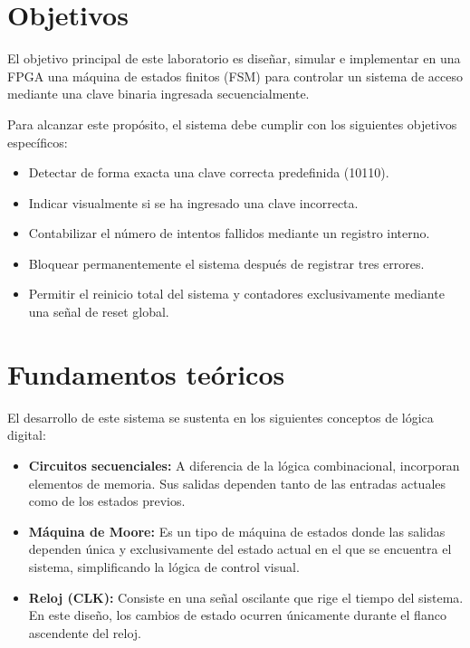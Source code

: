 \documentclass[letterpaper,12pt]{article}
\begin{document}
\section{Objetivos}
El objetivo principal de este laboratorio es diseñar, simular e implementar en una FPGA una máquina de estados finitos (FSM) para controlar un sistema de acceso mediante una clave binaria ingresada secuencialmente.

Para alcanzar este propósito, el sistema debe cumplir con los siguientes objetivos específicos:
\begin{itemize}
    \item Detectar de forma exacta una clave correcta predefinida (10110).
    \item Indicar visualmente si se ha ingresado una clave incorrecta.
    \item Contabilizar el número de intentos fallidos mediante un registro interno.
    \item Bloquear permanentemente el sistema después de registrar tres errores.
    \item Permitir el reinicio total del sistema y contadores exclusivamente mediante una señal de reset global.
\end{itemize}

\section{Fundamentos teóricos}
El desarrollo de este sistema se sustenta en los siguientes conceptos de lógica digital:
\begin{itemize}
    \item \textbf{Circuitos secuenciales:} A diferencia de la lógica combinacional, incorporan elementos de memoria. Sus salidas dependen tanto de las entradas actuales como de los estados previos.
    \item \textbf{Máquina de Moore:} Es un tipo de máquina de estados donde las salidas dependen única y exclusivamente del estado actual en el que se encuentra el sistema, simplificando la lógica de control visual.
    \item \textbf{Reloj (CLK):} Consiste en una señal oscilante que rige el tiempo del sistema. En este diseño, los cambios de estado ocurren únicamente durante el flanco ascendente del reloj.
\end{itemize}
\end{document}
